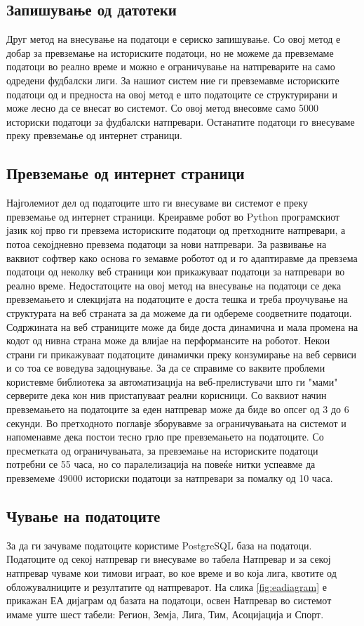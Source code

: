 \subsection{Запишување од датотеки}
Друг метод на внесување на податоци е сериско запишување. Со овој метод е добар за превземање на историските податоци, но не можеме да превземаме податоци во реално време и можно е ограничување на натпреварите на само одредени фудбалски лиги. За нашиот систем ние ги превземавме историските податоци од \cite{football-data} и предноста на овој метод е што податоците се структурирани и може лесно да се внесат во системот. Со овој метод внесовме само 5000 историски податоци за фудбалски натпревари. Останатите податоци го внесуваме преку превземање од интернет страници.
\subsection{Превземање од интернет страници}
Најголемиот дел од податоците што ги внесуваме ви системот е преку превземање од интернет страници. Креиравме робот во Python програмскиот јазик кој прво ги превзема историските податоци од претходните натпревари, а потоа секојдневно превзема податоци за нови натпревари. За развивање на ваквиот софтвер како основа го земавме роботот од \cite{mingov2016application} и го адаптиравме да превзема податоци од неколку веб страници кои прикажуваат податоци за натпревари во реално време. Недостатоците на овој метод на внесување на податоци се дека превземањето и слекцијата на податоците е доста тешка и треба проучување на структурата на веб страната за да можеме да ги одбереме соодветните податоци. Содржината на веб страниците може да биде доста динамична и мала промена на кодот од нивна страна може да влијае на перформансите на роботот. Некои страни ги прикажуваат податоците динамички преку конзумирање на веб сервиси и со тоа се воведува задоцнување. За да се справиме со ваквите проблеми користевме библиотека за автоматизација на веб-прелистувачи \cite{wang2012test} што ги "мами" серверите дека кон нив пристапуваат реални корисници. Со ваквиот начин превземањето на податоците за еден натпревар може да биде во опсег од 3 до 6 секунди. Во претходното поглавје зборувавме за ограничувањата на системот и напоменавме дека постои тесно грло пре превземањето на податоците. Со пресметката од ограничувањата, за превземање на историските податоци потребни се 55 часа, но со паралелизација на повеќе нитки успеавме да превземеме 49000 историски податоци за натпревари за помалку од 10 часа.
\subsection{Чување на податоците}
За да ги зачуваме податоците користиме PostgreSQL \cite{momjian2001postgresql} база на податоци. Податоците од секој натпревар ги внесуваме во табела Натпревар и за секој натпревар чуваме кои тимови играат, во кое време и во која лига, квотите од обложувалниците и резултатите од натпреварот. На слика \ref{fig:eadiagram} е прикажан ЕА дијаграм од базата на податоци, освен Натпревар во системот имаме уште шест табели: Регион, Земја, Лига, Тим, Асоцијација и Спорт. 

